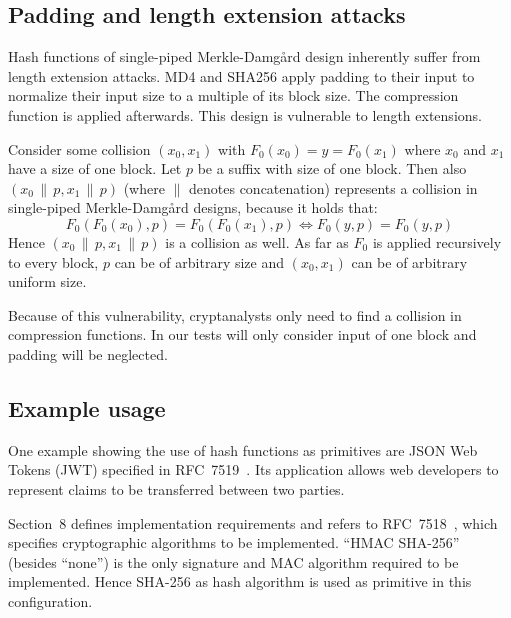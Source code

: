 \subsection{Padding and length extension attacks}
\label{sec:hash-length-ext-attack}
%
Hash functions of single-piped Merkle-Damg\aa{}rd design inherently suffer
from length extension attacks. MD4 and SHA256 apply padding to their input
to normalize their input size to a multiple of its block size.
The compression function is applied afterwards. This design is vulnerable
to length extensions.

Consider some collision $(x_0, x_1)$ with $F_0(x_0) = y = F_0(x_1)$ where $x_0$ and
$x_1$ have a size of one block. Let $p$ be a suffix with size of one block.
Then also $(x_0 \,\|\, p, x_1 \,\|\, p)$ (where $\|$ denotes concatenation)
represents a collision in single-piped Merkle-Damg\aa{}rd designs, because
it holds that:
\[ F_0(F_0(x_0), p) = F_0(F_0(x_1), p) \iff F_0(y, p) = F_0(y, p) \]
Hence $(x_0 \,\|\, p, x_1 \,\|\, p)$ is a collision as well.
As far as $F_0$ is applied recursively to every block, $p$ can be of arbitrary size
and $(x_0, x_1)$ can be of arbitrary uniform size.

Because of this vulnerability, cryptanalysts only need to find a collision
in compression functions. In our tests will only consider input of one block
and padding will be neglected.

\subsection{Example usage}
\label{sec:hash-usage}
%
One example showing the use of hash functions as primitives are JSON Web Tokens (JWT)
specified in RFC~7519~\cite{rfc7519}. Its application allows web developers to
represent claims to be transferred between two parties.

Section~8 defines implementation requirements
and refers to RFC~7518~\cite{rfc7518}, which specifies cryptographic algorithms to
be implemented. \enquote{HMAC SHA-256} (besides \enquote{none}) is the only signature
and MAC algorithm required to be implemented.
%
Hence SHA-256 as hash algorithm is used as primitive in this configuration.

